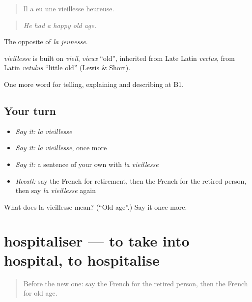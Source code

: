 \begin{quote}
Il a eu une vieillesse heureuse.
\end{quote}

\begin{quote}
\emph{He had a happy old age.}
\end{quote}

The opposite of \emph{la jeunesse}.

\begin{cousinweb}
\emph{vieillesse} is built on \emph{vieil}, \emph{vieux} \textquotedblleft{}old\textquotedblright{}, inherited from Late Latin \emph{veclus}, from Latin \emph{vetulus} \textquotedblleft{}little old\textquotedblright{} (Lewis \& Short).
\end{cousinweb}

\begin{grammarlens}[title={What you've built}]
One more word for telling, explaining and describing at B1.
\end{grammarlens}

\subsection*{Your turn}
\begin{itemize}
\raggedright
  \item \emph{Say it:} \emph{la vieillesse}
  \item \emph{Say it:} \emph{la vieillesse}, once more
  \item \emph{Say it:} a sentence of your own with \emph{la vieillesse}
  \item \emph{Recall:} say the French for retirement, then the French for the retired person, then say \emph{la vieillesse} again
\end{itemize}

\begin{tcolorbox}[breakable,colback=teal!4,colframe=teal!35!black,title={Before you move on}]
What does la vieillesse mean? (\textquotedblleft{}Old age\textquotedblright{}.) Say it once more.
\end{tcolorbox}
\section[hospitaliser]{hospitaliser — to take into hospital, to hospitalise}

\label{lesson:FR-C313-hospitaliser}



\begin{quote}
Before the new one: say the French for the retired person, then the French for old age.
\end{quote}

